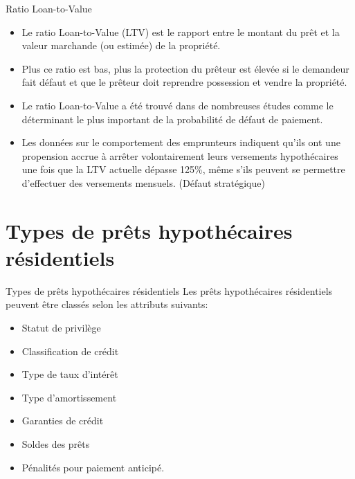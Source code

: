 \documentclass{beamer}
\begin{document}
\begin{frame}{Ratio Loan-to-Value}
\begin{itemize}[label=\bullet]
\item Le ratio Loan-to-Value (LTV) est le rapport entre le montant du prêt et la valeur marchande (ou estimée) de la propriété.
\vspace{0.5cm}
\item Plus ce ratio est bas, plus la protection du prêteur est élevée si le demandeur fait défaut et que le prêteur doit reprendre possession et vendre la propriété.
\vspace{0.5cm}
\item Le ratio Loan-to-Value a été trouvé dans de nombreuses études comme le déterminant le plus important de la probabilité de défaut de paiement.
\vspace{0.5cm}
\item Les données sur le comportement des emprunteurs indiquent qu'ils ont une propension accrue à arrêter volontairement leurs versements hypothécaires une fois que la LTV actuelle dépasse 125\%, même s'ils peuvent se permettre d'effectuer des versements mensuels. (Défaut stratégique)
\end{itemize}
\end{frame}


\section{Types de prêts hypothécaires résidentiels}

\begin{frame}{Types de prêts hypothécaires résidentiels}
Les prêts hypothécaires résidentiels peuvent être classés selon les attributs suivants:
\begin{itemize}[label=\bullet]
\item Statut de privilège
\item Classification de crédit
\item Type de taux d'intérêt
\item Type d'amortissement
\item Garanties de crédit
\item Soldes des prêts
\item Pénalités pour paiement anticipé.
\end{itemize}
\end{frame}
\end{document}
